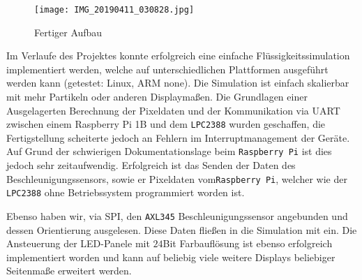 \begin{wrapfigure}{r}{0.5\textwidth}
	\centering
	\texttt{[image: IMG\_20190411\_030828.jpg]}
	\caption{Fertiger Aufbau}
	\label{fig:result}
\end{wrapfigure}

Im Verlaufe des Projektes konnte erfolgreich eine einfache Flüssigkeitssimulation implementiert werden, welche auf unterschiedlichen Plattformen ausgeführt werden kann (getestet: Linux, ARM none). Die Simulation ist einfach skalierbar mit mehr Partikeln oder anderen Displaymaßen. Die Grundlagen einer Ausgelagerten Berechnung der Pixeldaten und der Kommunikation via UART zwischen einem Raspberry Pi 1B und dem \texttt{LPC2388} wurden geschaffen, die Fertigstellung scheiterte jedoch an Fehlern im Interruptmanagement der Geräte. Auf Grund der schwierigen Dokumentationslage beim \texttt{Raspberry Pi} ist dies jedoch sehr zeitaufwendig. Erfolgreich ist das Senden der Daten des Beschleunigungssensors, sowie er Pixeldaten vom\texttt{Raspberry Pi}, welcher wie der \texttt{LPC2388} ohne Betriebssystem programmiert worden ist.

Ebenso haben wir, via SPI, den \texttt{AXL345} Beschleunigungssensor angebunden und dessen Orientierung ausgelesen. Diese Daten fließen in die Simulation mit ein. Die Ansteuerung der LED-Panele mit $24$Bit Farbauflösung ist ebenso erfolgreich implementiert worden und kann auf beliebig viele weitere Displays beliebiger Seitenmaße erweitert werden.